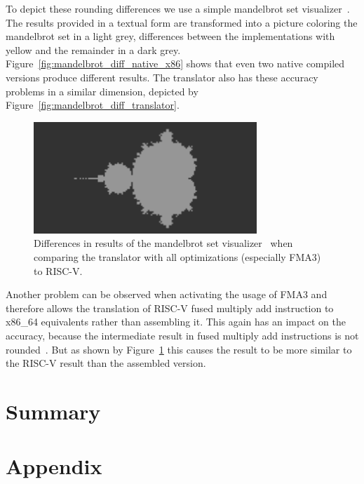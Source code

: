 \documentclass[course=eragp]{aspdoc}
\begin{document}
To depict these rounding differences we use a simple mandelbrot set
visualizer~\cite{mandelbrot_program}. The results provided in a textual form are transformed into a
picture coloring the mandelbrot set in a light grey, differences between the implementations with
yellow and the remainder in a dark grey. Figure~\ref{fig:mandelbrot_diff_native_x86} shows that even
two native compiled versions produce different results. The translator also has these accuracy
problems in a similar dimension, depicted by Figure~\ref{fig:mandelbrot_diff_translator}.

\par

\begin{figure}[H]
    \centering
    \includegraphics[width=0.75\textwidth]{images/mandelbrot_differences/fma_diff.png}
    \caption{Differences in results of the mandelbrot set visualizer~\cite{mandelbrot_program} when
        comparing the translator with all optimizations (especially FMA3) to RISC-V.}\label{fig:mandelbrot_diff_fma3}
\end{figure}

Another problem can be observed when activating the usage of FMA3 and therefore allows the
translation of RISC-V fused multiply add instruction to x86\_64 equivalents rather than assembling
it. This again has an impact on the accuracy, because the intermediate result in fused multiply add
instructions is not rounded~\cite{intel2017man}. But as shown by
Figure~\ref{fig:mandelbrot_diff_fma3} this causes the result to be more similar to the RISC-V result
than the assembled version.

\section{Summary}

\clearpage


{}

\appendix
\section{Appendix}
\end{document}

